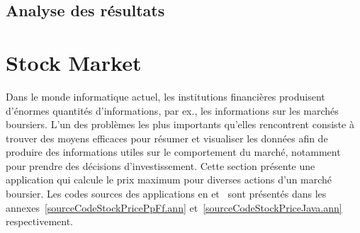



\subsection{Analyse des r\'esultats}







\section{Stock Market}
\label{stockprice.sect}


Dans le monde informatique actuel, les institutions financi\`eres produisent d'\'enormes quantit\'es d'informations, par ex., les informations sur les march\'es boursiers. L'un des probl\`emes les plus importants qu'elles rencontrent consiste \`a trouver des moyens efficaces pour r\'esumer et visualiser les donn\'ees afin de produire des informations utiles sur le comportement du march\'e, notamment pour prendre des d\'ecisions d'investissement. Cette section pr\'esente une application qui calcule le prix maximum pour diverses actions d'un marché boursier. Les codes sources des applications  en  et~ sont pr\'esent\'es dans les annexes~\ref{sourceCodeStockPricePpFf.ann} et~\ref{sourceCodeStockPriceJava.ann} respectivement. 

